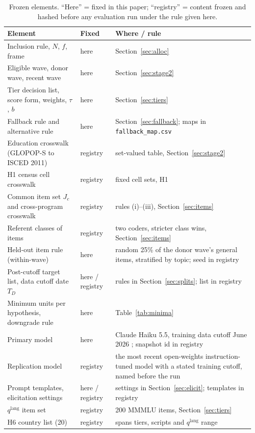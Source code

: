 \documentclass[10pt]{article}
\begin{document}
\begin{table}[!htbp]
\centering
\small
\caption{Frozen elements. ``Here'' = fixed in this paper; ``registry'' = content frozen and hashed before any evaluation run under the rule given here.}
\label{tab:registry}
\begin{tabular}{@{}L{5.0cm}L{1.4cm}L{8.0cm}@{}}
\toprule
Element & Fixed & Where / rule \\
\midrule
Inclusion rule, $N$, $f$, frame & here & Section~\ref{sec:alloc} \\
Eligible wave, donor wave, recent wave & here & Section~\ref{sec:stage2} \\
Tier decision list, score form, weights, $\tau$, $b$ & here & Section~\ref{sec:tiers} \\
Fallback rule and alternative rule & here & Section~\ref{sec:fallback}; maps in \nolinkurl{fallback_map.csv} \\
Education crosswalk (GLOPOP-S to ISCED 2011) & registry & set-valued table, Section~\ref{sec:stage2} \\
H1 census cell crosswalk & registry & fixed cell sets, H1 \\
Common item set $J_c$ and cross-program crosswalk & registry & rules (i)--(iii), Section~\ref{sec:items} \\
Referent classes of items & registry & two coders, stricter class wins, Section~\ref{sec:items} \\
Held-out item rule (within-wave) & here & random 25\% of the donor wave's general items, stratified by topic; seed in registry \\
Post-cutoff target list, data cutoff date $T_D$ & here / registry & rules in Section~\ref{sec:splits}; list in registry \\
Minimum units per hypothesis, downgrade rule & here & Table~\ref{tab:minima} \\
Primary model & here & Claude Haiku 5.5, training data cutoff June 2026 \citep{claudemodels}; snapshot id in registry \\
Replication model & registry & the most recent open-weights instruction-tuned model with a stated training cutoff, named before the run \\
Prompt templates, elicitation settings & here / registry & settings in Section~\ref{sec:elicit}; templates in registry \\
$q^{\text{lang}}$ item set & registry & 200 MMMLU items, Section~\ref{sec:tiers} \\
H6 country list (20) & registry & spans tiers, scripts and $q^{\text{lang}}$ range \\

\end{tabular}
\end{table}
\end{document}
